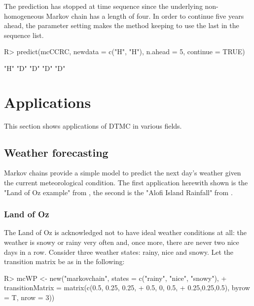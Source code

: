 \documentclass[nojss]{jss}
\begin{document}
The prediction has stopped at time sequence since the underlying
non-homogeneous Markov chain has a length of four. In order to continue five
years ahead, the  parameter setting makes the 
method keeping to use the last  in the sequence list.


\begin{Schunk}
\begin{Sinput}
R> predict(mcCCRC, newdata = c("H", "H"), n.ahead = 5, continue = TRUE)
\end{Sinput}
\begin{Soutput}
[1] "H" "D" "D" "D" "D"
\end{Soutput}
\end{Schunk}

\section{Applications}\label{sec:applications}

This section shows applications of DTMC in various
fields.

\subsection{Weather forecasting}\label{app:weather}

Markov chains provide a simple model to predict the next day's weather given the
current meteorological condition.
The first application herewith shown is the "Land of Oz example" from \cite{landOfOz}, the second is the "Alofi Island Rainfall" from \cite{averyHenderson}.

\subsubsection{Land of Oz}\label{sec:wfLandOfOz}

The Land of Oz is 
acknowledged not to have ideal weather conditions at all: 
the weather is snowy or rainy very often and, once more, there are never two
nice days in a row. Consider three weather states: rainy, nice and snowy. Let the transition matrix be as in the following:

\begin{Schunk}
\begin{Sinput}
R> mcWP <- new("markovchain", states = c("rainy", "nice", "snowy"),
+           transitionMatrix = matrix(c(0.5, 0.25, 0.25,
+                                     0.5, 0, 0.5,
+                                     0.25,0.25,0.5), byrow = T, nrow = 3))
\end{Sinput}
\end{Schunk}
\end{document}
